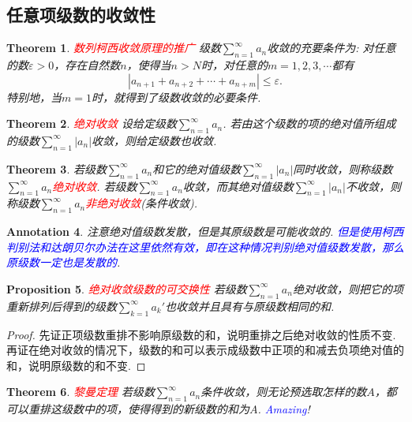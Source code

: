 \documentclass{article}
\newtheorem{theorem}{Theorem}[section]
\newtheorem{proposition}[theorem]{Proposition}
\newtheorem{annotation}[theorem]{Annotation}
\newcommand{\redt}[1]{\textcolor{red}{#1}}
\newcommand{\bluet}[1]{\textcolor{blue}{#1}}
\begin{document}
\newpage
\subsection{任意项级数的收敛性}

\begin{theorem}
\rm \redt{数列柯西收敛原理的推广} 级数$\sum\limits_{n=1}^{\infty}a_n$收敛的充要条件为: 对任意的数$\varepsilon > 0$，存在自然数$n$，使得当$n > N$时，对任意的$m=1,2,3,\cdots$都有
$$
|a_{n+1}+a_{n+2}+\cdots+a_{n+m}| \leq \varepsilon.
$$
特别地，当$m=1$时，就得到了级数收敛的必要条件. 
\end{theorem}

\begin{theorem}
\rm \redt{绝对收敛} 设给定级数$\sum\limits_{n=1}^{\infty}a_n$. 若由这个级数的项的绝对值所组成的级数$\sum\limits_{n=1}^{\infty}|a_n|$收敛，则给定级数也收敛.
\end{theorem}

\begin{theorem}
\rm 若级数$\sum\limits_{n=1}^{\infty}a_n$和它的绝对值级数$\sum\limits_{n=1}^{\infty}|a_n|$同时收敛，则称级数$\sum\limits_{n=1}^{\infty}a_n$\redt{绝对收敛}. 若级数$\sum\limits_{n=1}^{\infty}a_n$收敛，而其绝对值级数$\sum\limits_{n=1}^{\infty}|a_n|$不收敛，则称级数$\sum\limits_{n=1}^{\infty}a_n$\redt{非绝对收敛}(条件收敛).
\end{theorem}

\begin{annotation}
\rm 注意绝对值级数发散，但是其原级数是可能收敛的. \bluet{但是使用柯西判别法和达朗贝尔办法在这里依然有效，即在这种情况判别绝对值级数发散，那么原级数一定也是发散的}. 
\end{annotation}

\begin{proposition}
\rm \redt{绝对收敛级数的可交换性} 若级数$\sum\limits_{n=1}^{\infty}a_n$绝对收敛，则把它的项重新排列后得到的级数$\sum\limits_{k=1}^{\infty}a_k'$也收敛并且具有与原级数相同的和. 
\end{proposition}

\begin{proof}
先证正项级数重排不影响原级数的和，说明重排之后绝对收敛的性质不变. 再证在绝对收敛的情况下，级数的和可以表示成级数中正项的和减去负项绝对值的和，说明原级数的和不变.  
\end{proof}

\begin{theorem}
\rm \redt{黎曼定理} 若级数$\sum\limits_{n=1}^{\infty}a_n$条件收敛，则无论预选取怎样的数$A$，都可以重排这级数中的项，使得得到的新级数的和为$A$. \bluet{Amazing}!
\end{theorem}
\end{document}
